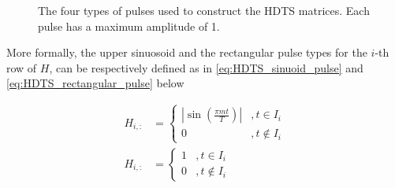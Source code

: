 \documentclass[10pt,a4paper, final]{report} %
\begin{document}
\begin{figure}[H]
\centering
{}
\caption{The four types of pulses used to construct the HDTS matrices. Each pulse has a maximum amplitude of 1.}
\label{fig:HDTS_pulse_types}
\end{figure}

More formally, the upper sinuosoid and the rectangular pulse types for the $i$-th row of $H$, can be respectively defined as in \eqref{eq:HDTS_sinuoid_pulse} and \eqref{eq:HDTS_rectangular_pulse} below

\begin{align}
H_{i,:} &= 
\begin{cases}
| \sin(\frac{\pi m t}{T}) | &, t \in I_i\\
0 &,  t \not \in I_i
\end{cases}\label{eq:HDTS_sinuoid_pulse}\\
H_{i,:} &= 
\begin{cases}
1 &,  t \in I_i\\
0 &, t \not \in I_i
\end{cases} \label{eq:HDTS_rectangular_pulse}
\end{align}
\end{document}
